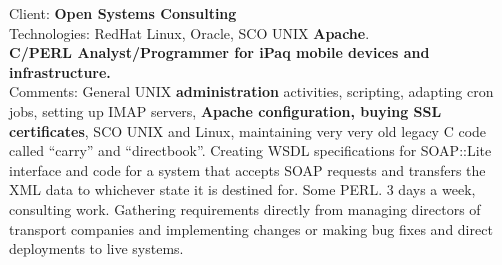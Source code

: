 \documentclass{article}
\begin{document}
%
%



Client: 	\textbf  { Open Systems Consulting }  \\
Technologies: 	RedHat Linux, Oracle, SCO UNIX \textbf{Apache}. \\
\textbf{ 		C/PERL Analyst/Programmer for iPaq mobile devices and infrastructure. } \\
Comments:	General UNIX {\bf administration} activities, scripting, adapting cron jobs, setting up IMAP servers, \textbf{Apache configuration, buying SSL certificates}, SCO UNIX and Linux, maintaining very very old legacy C code called “carry” and “directbook”. Creating WSDL specifications for SOAP::Lite interface and code for a system that accepts SOAP requests and transfers the XML data to whichever state it is destined for. Some PERL.  3 days a week, consulting work. Gathering requirements directly from managing directors of transport companies and implementing changes or making bug fixes and direct deployments to live systems. \\
\\
\end{document}
